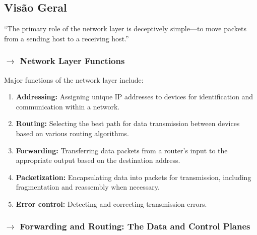 \subsection[4.1 Visão Geral]{\hspace*{0.075 em}\raisebox{0.2 em}{$\pmb{\drsh}$} Visão Geral}
\label{subsec:network-layer-overview}

``The primary role of the network layer is deceptively simple---to move packets from a sending host to a receiving host.''\cite{Kurose2017}

\subsubsection[4.1.1 Network Layer Functions]{$\pmb{\rightarrow}$ Network Layer Functions}

Major functions of the network layer include:

\begin{enumerate}
    \item \textbf{Addressing:} Assigning unique IP addresses to devices for identification and communication within a network.
    \item \textbf{Routing:} Selecting the best path for data transmission between devices based on various routing algorithms.
    \item \textbf{Forwarding:} Transferring data packets from a router's input to the appropriate output based on the destination address.
    \item \textbf{Packetization:} Encapsulating data into packets for transmission, including fragmentation and reassembly when necessary.
    \item \textbf{Error control:} Detecting and correcting transmission errors.
\end{enumerate}

\subsubsection[4.1.2 Forwarding and Routing: The Data and Control Planes]{$\pmb{\rightarrow}$ Forwarding and Routing: The Data and Control Planes}

